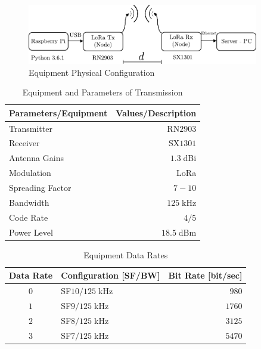 \begin{figure}[h!]
  \centering
  \includegraphics[width=0.9\textwidth]{Figure2}
  \caption{Equipment Physical Configuration}
  \label{fig:physicalconfig}
\end{figure}


\begin{table}[h!]
  \centering
  \caption{Equipment and Parameters of Transmission \cite{Microchip2016a}}
  \label{tab:EquipmentandParameters}
  \resizebox{8cm}{!} {
    \begin{tabular}{lr}
      \toprule
      \textbf{Parameters/Equipment} & \textbf{Values/Description} \\ 
      \midrule
      Transmitter & RN$2903$\\ 
      Receiver & SX$1301$\\ 
      Antenna Gains & $1.3\;$dBi\\ 
      Modulation & LoRa\\ 
      Spreading Factor & $7-10$\\
      Bandwidth & $125\;$kHz\\ 
      Code Rate & $4/5$\\ 
      Power Level & $18.5\;$dBm\\ 
      \bottomrule
    \end{tabular}
  }
\end{table}


\begin{table}[h!]
  \centering
  \caption{Equipment Data Rates \cite{N.SorninSemtechM.LuisSemtechT.EirichIBMT.KrampIBM2015}}
  \label{tab:datarates}
  \resizebox{9cm}{!} {
    \begin{tabular}{clr}
      \toprule
      \multicolumn{1}{l}{\textbf{Data Rate}} & \textbf{Configuration {[}SF/BW{]}} & \multicolumn{1}{l}{\textbf{Bit Rate {[}bit/sec{]}}} \\
      \midrule
      $0$                             & SF$10 / 125\;$kHz            & $980$                                        \\
      $1$                             & SF$9 / 125\;$kHz             & $1760$                                       \\
      $2$                             & SF$8 / 125\;$kHz             & $3125$                                       \\
      $3$                             & SF$7 / 125\;$kHz             & $5470$                                     \\
      \bottomrule
    \end{tabular}
  }
\end{table}

